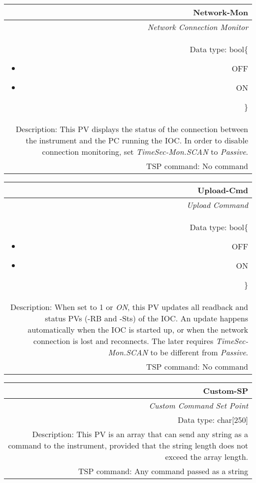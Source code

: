 \documentclass[openany]{article}
\begin{document}
		\begin{tabular}{N}
			\hline
			\bfseries Network-Mon\label{pv:network-mon} \\ \hline
			\emph{Network Connection Monitor} \\
			Data type: bool\{\begin{itemize}[noitemsep]
				\small
				\item[] OFF
				\item[] ON
			\end{itemize}\} \\
			Description: This PV displays the status of the connection between the instrument and the PC running the IOC. In order to disable connection monitoring, set \emph{TimeSec-Mon.SCAN} to \emph{Passive}. \\
			TSP command: No command
		\end{tabular}

		\begin{tabular}{N}
			\hline
			\bfseries Upload-Cmd\label{pv:upload-cmd} \\ \hline
			\emph{Upload Command} \\
			Data type: bool\{\begin{itemize}[noitemsep]
				\small
				\item[] OFF
				\item[] ON
			\end{itemize}\} \\
			Description: When set to 1 or \emph{ON}, this PV updates all readback and status PVs (-RB and -Sts) of the IOC. An update happens automatically when the IOC is started up, or when the network connection is lost and reconnects. The later requires \emph{TimeSec-Mon.SCAN} to be different from \emph{Passive}. \\
			TSP command: No command
		\end{tabular}

		\begin{tabular}{N}
			\hline
			\bfseries Custom-SP\label{pv:custom-sp} \\ \hline
			\emph{Custom Command Set Point} \\
			Data type: char[250] \\
			Description: This PV is an array that can send any string as a command to the instrument, provided that the string length does not exceed the array length. \\
			TSP command: Any command passed as a string
		\end{tabular}
\end{document}
